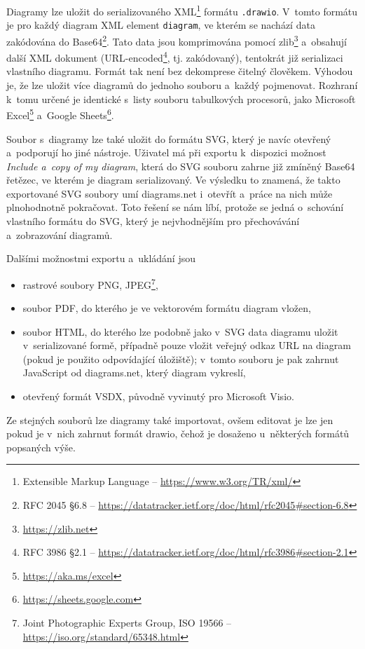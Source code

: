 Diagramy lze uložit do serializovaného XML\footnote{Extensible Markup Language
-- \url{https://www.w3.org/TR/xml/}} formátu \texttt{.drawio}. V~tomto formátu je pro
každý diagram XML element \texttt{diagram}, ve kterém se nachází data zakódována
do Base64\footnote{RFC 2045 \S6.8 --
\url{https://datatracker.ietf.org/doc/html/rfc2045\#section-6.8}}. Tato data
jsou komprimována pomocí zlib\footnote{\url{https://zlib.net}} a~obsahují další
XML dokument (URL-encoded\footnote{RFC 3986 \S2.1 --
\url{https://datatracker.ietf.org/doc/html/rfc3986\#section-2.1}}, tj.
zakódovaný), tentokrát již serializaci vlastního diagramu. Formát tak není bez
dekomprese čitelný člověkem. Výhodou je, že lze uložit více diagramů do jednoho
souboru a~každý pojmenovat. Rozhraní k~tomu určené je identické s~listy souboru
tabulkových procesorů, jako Microsoft Excel\footnote{\url{https://aka.ms/excel}}
a~Google Sheets\footnote{\url{https://sheets.google.com}}.

Soubor s~diagramy lze také uložit do formátu SVG, který je navíc otevřený
a~podporují ho jiné nástroje. Uživatel má při exportu k~dispozici možnost
\textit{Include a~copy of my diagram}, která do SVG souboru zahrne již zmíněný
Base64 řetězec, ve kterém je diagram serializovaný. Ve výsledku to znamená, že
takto exportované SVG soubory umí diagrams.net i~otevřít a~práce na nich může
plnohodnotně pokračovat. Toto řešení se nám líbí, protože se jedná o~schování
vlastního formátu do SVG, který je nejvhodnějším pro přechovávání a~zobrazování
diagramů.

Dalšími možnostmi exportu a~ukládání jsou
\begin{itemize}
  \item rastrové soubory PNG, JPEG\footnote{Joint Photographic Experts Group,
  ISO 19566 -- \url{https://iso.org/standard/65348.html}},
  \item soubor PDF, do kterého je ve vektorovém formátu diagram vložen,
  \item soubor HTML, do kterého lze podobně jako v~SVG data diagramu uložit
v~serializované formě, případně pouze vložit veřejný odkaz URL na diagram (pokud
je použito odpovídající úložiště); v~tomto souboru je pak zahrnut JavaScript od
diagrams.net, který diagram vykreslí,
  \item otevřený formát VSDX, původně vyvinutý pro Microsoft Visio.
\end{itemize}

Ze stejných souborů lze diagramy také importovat, ovšem editovat je lze jen
pokud je v~nich zahrnut formát drawio, čehož je dosaženo u~některých formátů
popsaných výše.

